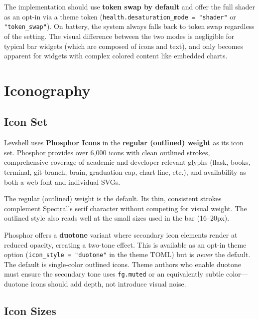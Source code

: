 \documentclass[11pt,a4paper]{article}
\begin{document}
The implementation should use \textbf{token swap by default} and offer the full shader as an opt-in via a theme token (\texttt{health.desaturation\_mode = "shader"} or \texttt{"token\_swap"}). On battery, the system always falls back to token swap regardless of the setting. The visual difference between the two modes is negligible for typical bar widgets (which are composed of icons and text), and only becomes apparent for widgets with complex colored content like embedded charts.


\section{Iconography}
\label{sec:icons}

\subsection{Icon Set}

Levshell uses \textbf{Phosphor Icons} in the \textbf{regular (outlined) weight} as its icon set. Phosphor provides over 6,000 icons with clean outlined strokes, comprehensive coverage of academic and developer-relevant glyphs (flask, books, terminal, git-branch, brain, graduation-cap, chart-line, etc.), and availability as both a web font and individual SVGs.

The regular (outlined) weight is the default. Its thin, consistent strokes complement Spectral's serif character without competing for visual weight. The outlined style also reads well at the small sizes used in the bar (16--20px).

\begin{designbox}
Phosphor offers a \textbf{duotone} variant where secondary icon elements render at reduced opacity, creating a two-tone effect. This is available as an opt-in theme option (\texttt{icon\_style = "duotone"} in the theme TOML) but is \emph{never} the default. The default is single-color outlined icons. Theme authors who enable duotone must ensure the secondary tone uses \texttt{fg.muted} or an equivalently subtle color---duotone icons should add depth, not introduce visual noise.
\end{designbox}

\subsection{Icon Sizes}
\end{document}
